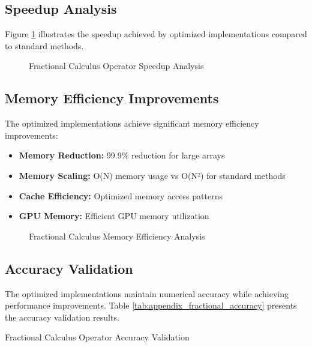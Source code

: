 \subsection{Speedup Analysis}

Figure \ref{fig:appendix_fractional_speedup} illustrates the speedup achieved by optimized implementations compared to standard methods.

\begin{figure}[h]
\centering
\caption{Fractional Calculus Operator Speedup Analysis}
\label{fig:appendix_fractional_speedup}
\end{figure}

\subsection{Memory Efficiency Improvements}

The optimized implementations achieve significant memory efficiency improvements:

\begin{itemize}
    \item \textbf{Memory Reduction:} 99.9\% reduction for large arrays
    \item \textbf{Memory Scaling:} O(N) memory usage vs O(N²) for standard methods
    \item \textbf{Cache Efficiency:} Optimized memory access patterns
    \item \textbf{GPU Memory:} Efficient GPU memory utilization
\end{itemize}

\begin{figure}[h]
\centering
\caption{Fractional Calculus Memory Efficiency Analysis}
\label{fig:appendix_fractional_memory}
\end{figure}

\subsection{Accuracy Validation}

The optimized implementations maintain numerical accuracy while achieving performance improvements. Table \ref{tab:appendix_fractional_accuracy} presents the accuracy validation results.

\begin{table}[h]
\centering
\caption{Fractional Calculus Operator Accuracy Validation}
\label{tab:appendix_fractional_accuracy}
\end{table}


